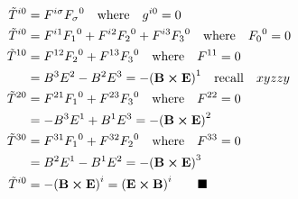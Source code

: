 \documentclass{article}
\begin{document}
\begin{align*}
  \tilde{T}^{i0} & =F^{i\sigma}{F_\sigma}^0\qq{where}g^{i0}=0                                  \\
  \tilde{T}^{i0} & =F^{i1}{F_1}^0+F^{i2}{F_2}^0+F^{i3}{F_3}^0\qq{where}{F_0}^0=0               \\
  \tilde{T}^{10} & =F^{12}{F_2}^0+F^{13}{F_3}^0\qq{where}F^{11}=0                              \\
                 & =B^3E^2-B^2E^3=-\pqty{\vb{B}\cross\vb{E}}^1\qq{recall}xyzzy                 \\
  \tilde{T}^{20} & =F^{21}{F_1}^0+F^{23}{F_3}^0\qq{where}F^{22}=0                              \\                  
                 & =-B^3E^1+B^1E^3=-\pqty{\vb{B}\cross\vb{E}}^2                                \\                  
  \tilde{T}^{30} & =F^{31}{F_1}^0+F^{32}{F_2}^0\qq{where}F^{33}=0                              \\                
                 & =B^2E^1-B^1E^2=-\pqty{\vb{B}\cross\vb{E}}^3                                 \\                
  \tilde{T}^{i0} & =-\pqty{\vb{B}\cross\vb{E}}^i=\pqty{\vb{E}\cross\vb{B}}^i\qquad\blacksquare \\
\end{align*}
\end{document}
